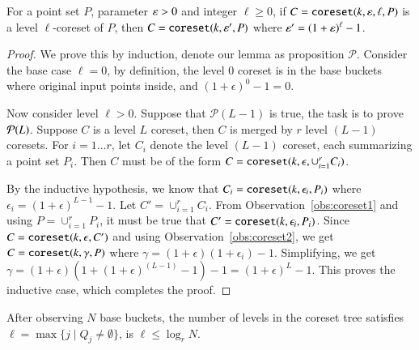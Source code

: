 \begin{lemma}
\label{lemma:cstree-level2}
For a point set $P$, parameter $\varepsilon > 0$ and integer $\ell \ge 0$, 
if $C = \texttt{coreset}(k,\varepsilon,\ell,P)$ is a level $\ell$-coreset of $P$, 
then $C = \texttt{coreset}(k, \varepsilon', P)$ where $\varepsilon' = \left(1+\varepsilon \right)^{\ell} - 1$.
\end{lemma}
\begin{proof}
	We prove this by induction, denote our lemma as proposition $\mathcal{P}$. 
	Consider the base case $\ell = 0$, by definition,
	the level $0$ coreset is in the base buckets where original input points inside, 
	and $\left(1+\epsilon \right)^{0} - 1 = 0$.
	
	Now consider level $\ell > 0$. Suppose that $\mathcal{P}(L - 1)$ is true, 
	the task is to prove ${\cal P}(L)$.
	Suppose $C$ is a level $L$ coreset, then $C$ is merged by $r$ level $(L - 1)$ coresets. 
	For $i=1 \ldots r$, let $C_i$ denote the level $(L - 1)$ coreset, 
	each summarizing a point set $P_i$. 
	Then $C$ must be of the form $C = \texttt{coreset}(k, \epsilon, \cup_{i=1}^r C_i)$.

	By the inductive hypothesis, we know that $C_i = \texttt{coreset}(k, \epsilon_i, P_i)$
	where $\epsilon_i = \left(1 + \epsilon \right)^{L-1} - 1$.  
	Let $C' = \cup_{i=1}^r C_i$. From Observation~\ref{obs:coreset1} and using
	$P = \cup_{i=1}^r P_i$, it must be true that $C'= \texttt{coreset}(k, \epsilon_i, P_i)$.
	Since $C = \texttt{coreset}(k, \epsilon, C')$ and using Observation~\ref{obs:coreset2}, we
	get $C=\texttt{coreset}(k, \gamma, P)$ where
	$\gamma = (1 + \epsilon)(1 + \epsilon_i) - 1$. Simplifying, we get
	$\gamma = (1 + \epsilon)(1 + \left(1 + \epsilon \right)^{(L-1)} - 1)-1 =
	\left(1 + \epsilon \right )^L - 1$.
	This proves the inductive case, which completes the proof.
\end{proof}


\begin{fact}
\label{fact:cstree-fact}
After observing $N$ base buckets, the number of levels in the coreset tree \ct satisfies
$\ell = \max \{ j \mid Q_j \neq \emptyset\}$, is $\ell \leq \log_r N$.
\end{fact}

